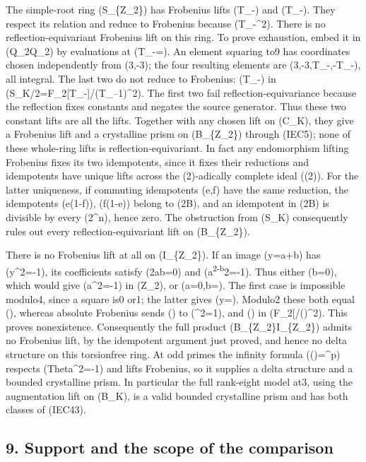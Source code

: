 \documentclass[
  10pt,
]{article}
\begin{document}
The simple-root ring (S\_\{\mathbb Z\_2\}) has Frobenius lifts
(T\_-) and (T\_-). They respect its relation and reduce
to Frobenius because (T\_-\^{}2). There is no
reflection-equivariant Frobenius lift on this ring. To prove exhaustion,
embed it in (\mathbb Q\_2\times\mathbb Q\_2) by evaluations at
(T\_-=). An element squaring to9 has coordinates chosen
independently from (3,-3); the four resulting elements are
(3,-3,T\_-,-T\_-), all integral. The last two do not reduce to
Frobenius: (T\_-) in (S\_K/2=\mathbb F\_2{[}T\_-{]}/(T\_--1)\^{}2).
The first two fail reflection-equivariance because the reflection fixes
constants and negates the source generator. Thus these two constant
lifts are all the lifts. Together with any chosen lift on (C\_K), they
give a Frobenius lift and a crystalline prism on (B\_\{\mathbb Z\_2\})
through (IEC5); none of these whole-ring lifts is
reflection-equivariant. In fact any endomorphism lifting Frobenius fixes
its two idempotents, since it fixes their reductions and idempotents
have unique lifts across the (2)-adically complete ideal ((2)). For the
latter uniqueness, if commuting idempotents (e,f) have the same
reduction, the idempotents (e(1-f)), (f(1-e)) belong to (2B), and an
idempotent in (2B) is divisible by every (2\^{}n), hence zero. The
obstruction from (S\_K) consequently rules out every
reflection-equivariant lift on (B\_\{\mathbb Z\_2\}).

There is no Frobenius lift at all on (I\_\{\mathbb Z\_2\}). If an image
(y=a+b\Theta) has (y\^{}2=-1), its coefficients satisfy (2ab=0) and
(a\textsuperscript{2-b}2=-1). Thus either (b=0), which would give
(a\^{}2=-1) in (\mathbb Z\_2), or (a=0,b=). The first case is
impossible modulo4, since a square is0 or1; the latter gives
(y=\pm\Theta). Modulo2 these both equal (\Theta), whereas absolute
Frobenius sends (\Theta) to (\Theta\^{}2=1), and () in
(\mathbb F\_2{[}\Theta{]}/()\^{}2). This proves nonexistence.
Consequently the full product
(B\_\{\mathbb Z\_2\}\times I\_\{\mathbb Z\_2\}) admits no Frobenius
lift, by the idempotent argument just proved, and hence no delta
structure on this torsionfree ring. At odd primes the infinity formula
(\Phi(\Theta)=\Theta\^{}p) respects (Theta\^{}2=-1) and lifts Frobenius,
so it supplies a delta structure and a bounded crystalline prism. In
particular the full rank-eight model at3, using the augmentation lift on
(B\_K), is a valid bounded crystalline prism and has both classes of
(IEC43).

\subsection{9. Support and the scope of the
comparison}\label{support-and-the-scope-of-the-comparison}
\end{document}
